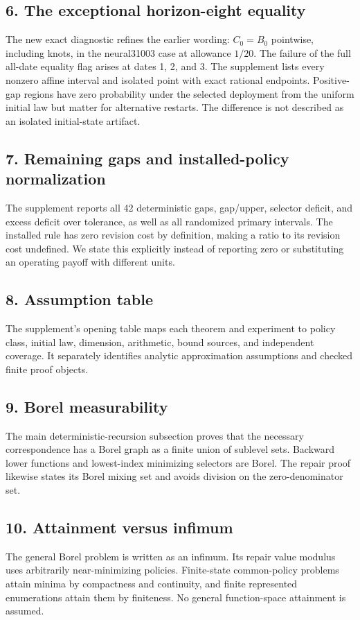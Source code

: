 \subsection{6. The exceptional horizon-eight equality}
The new exact diagnostic refines the earlier wording: $C_0=B_0$ pointwise, including knots, in the neural31003 case at allowance $1/20$. The failure of the full all-date equality flag arises at dates 1, 2, and 3. The supplement lists every nonzero affine interval and isolated point with exact rational endpoints. Positive-gap regions have zero probability under the selected deployment from the uniform initial law but matter for alternative restarts. The difference is not described as an isolated initial-state artifact.
\subsection{7. Remaining gaps and installed-policy normalization}
The supplement reports all 42 deterministic gaps, gap/upper, selector deficit, and excess deficit over tolerance, as well as all randomized primary intervals. The installed rule has zero revision cost by definition, making a ratio to its revision cost undefined. We state this explicitly instead of reporting zero or substituting an operating payoff with different units.
\subsection{8. Assumption table}
The supplement's opening table maps each theorem and experiment to policy class, initial law, dimension, arithmetic, bound sources, and independent coverage. It separately identifies analytic approximation assumptions and checked finite proof objects.
\subsection{9. Borel measurability}
The main deterministic-recursion subsection proves that the necessary correspondence has a Borel graph as a finite union of sublevel sets. Backward lower functions and lowest-index minimizing selectors are Borel. The repair proof likewise states its Borel mixing set and avoids division on the zero-denominator set.
\subsection{10. Attainment versus infimum}
The general Borel problem is written as an infimum. Its repair value modulus uses arbitrarily near-minimizing policies. Finite-state common-policy problems attain minima by compactness and continuity, and finite represented enumerations attain them by finiteness. No general function-space attainment is assumed.
